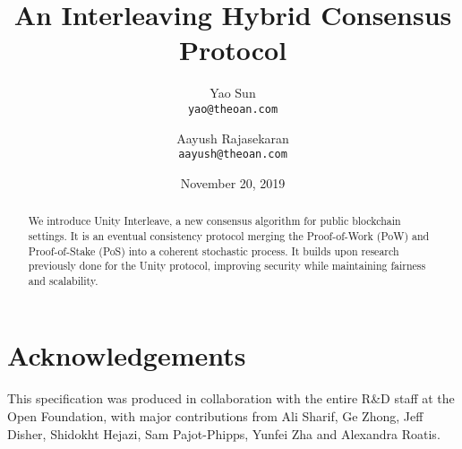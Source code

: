 \documentclass{article}
\title{An Interleaving Hybrid Consensus Protocol}
\author{
  Yao Sun\\
  \texttt{yao@theoan.com}
  \and
  Aayush Rajasekaran\\
  \texttt{aayush@theoan.com}
}
\date{November 20, 2019}
\begin{document}
\maketitle

\begin{abstract}
    We introduce Unity Interleave, a new consensus algorithm for public blockchain settings.
    It is an eventual consistency protocol merging the Proof-of-Work (PoW) and Proof-of-Stake (PoS)
    into a coherent stochastic process. It builds upon research previously done for the Unity
    protocol, improving security while maintaining fairness and scalability.
\end{abstract}

\section*{Acknowledgements}

This specification was produced in collaboration with the entire R\&D staff at the Open Foundation, with major contributions from Ali Sharif, Ge Zhong, Jeff Disher, Shidokht Hejazi, Sam Pajot-Phipps, Yunfei Zha and Alexandra Roatis.

\newpage
\tableofcontents
\newpage










\pagebreak


\end{document}
